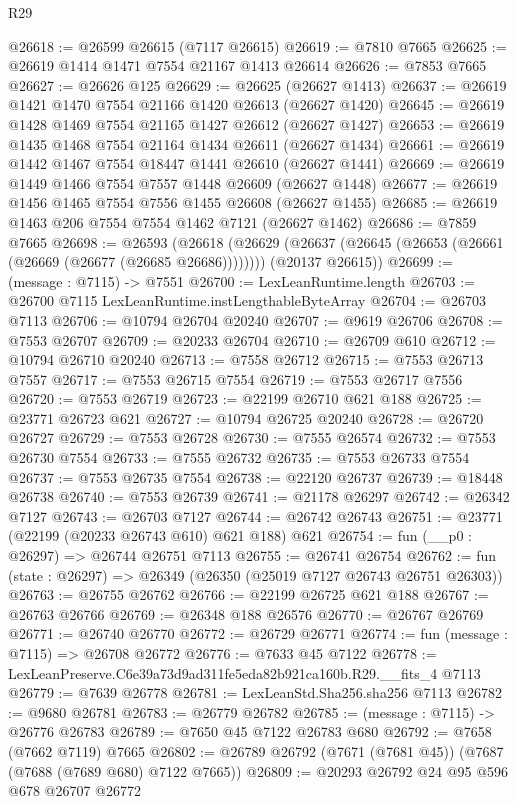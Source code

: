 \begin{lexlean}{R29}
\begin{coremodule}
@26618 := @26599 @26615 (@7117 @26615)
@26619 := @7810 @7665
@26625 := @26619 @1414 @1471 @7554 @21167 @1413 @26614
@26626 := @7853 @7665
@26627 := @26626 @125
@26629 := @26625 (@26627 @1413)
@26637 := @26619 @1421 @1470 @7554 @21166 @1420 @26613 (@26627 @1420)
@26645 := @26619 @1428 @1469 @7554 @21165 @1427 @26612 (@26627 @1427)
@26653 := @26619 @1435 @1468 @7554 @21164 @1434 @26611 (@26627 @1434)
@26661 := @26619 @1442 @1467 @7554 @18447 @1441 @26610 (@26627 @1441)
@26669 := @26619 @1449 @1466 @7554 @7557 @1448 @26609 (@26627 @1448)
@26677 := @26619 @1456 @1465 @7554 @7556 @1455 @26608 (@26627 @1455)
@26685 := @26619 @1463 @206 @7554 @7554 @1462 @7121 (@26627 @1462)
@26686 := @7859 @7665
@26698 := @26593
    (@26618
      (@26629 (@26637 (@26645 (@26653 (@26661 (@26669 (@26677 (@26685 @26686))))))))
      (@20137 @26615))
@26699 := (message : @7115) -> @7551
@26700 := LexLeanRuntime.length
@26703 := @26700 @7115 LexLeanRuntime.instLengthableByteArray
@26704 := @26703 @7113
@26706 := @10794 @26704 @20240
@26707 := @9619 @26706
@26708 := @7553 @26707
@26709 := @20233 @26704
@26710 := @26709 @610
@26712 := @10794 @26710 @20240
@26713 := @7558 @26712
@26715 := @7553 @26713 @7557
@26717 := @7553 @26715 @7554
@26719 := @7553 @26717 @7556
@26720 := @7553 @26719
@26723 := @22199 @26710 @621 @188
@26725 := @23771 @26723 @621
@26727 := @10794 @26725 @20240
@26728 := @26720 @26727
@26729 := @7553 @26728
@26730 := @7555 @26574
@26732 := @7553 @26730 @7554
@26733 := @7555 @26732
@26735 := @7553 @26733 @7554
@26737 := @7553 @26735 @7554
@26738 := @22120 @26737
@26739 := @18448 @26738
@26740 := @7553 @26739
@26741 := @21178 @26297
@26742 := @26342 @7127
@26743 := @26703 @7127
@26744 := @26742 @26743
@26751 := @23771 (@22199 (@20233 @26743 @610) @621 @188) @621
@26754 := fun (__p0 : @26297) => @26744 @26751 @7113
@26755 := @26741 @26754
@26762 := fun (state : @26297) => @26349 (@26350 (@25019 @7127 @26743 @26751 @26303))
@26763 := @26755 @26762
@26766 := @22199 @26725 @621 @188
@26767 := @26763 @26766
@26769 := @26348 @188 @26576
@26770 := @26767 @26769
@26771 := @26740 @26770
@26772 := @26729 @26771
@26774 := fun (message : @7115) => @26708 @26772
@26776 := @7633 @45 @7122
@26778 := LexLeanPreserve.C6e39a73d9ad311fe5eda82b921ca160b.R29.__fits_4 @7113
@26779 := @7639 @26778
@26781 := LexLeanStd.Sha256.sha256 @7113
@26782 := @9680 @26781
@26783 := @26779 @26782
@26785 := (message : @7115) -> @26776 @26783
@26789 := @7650 @45 @7122 @26783 @680
@26792 := @7658 (@7662 @7119) @7665
@26802 := @26789 @26792 (@7671 (@7681 @45)) (@7687 (@7688 (@7689 @680) @7122 @7665))
@26809 := @20293 @26792 @24 @95 @596 @678 @26707 @26772

\end{coremodule}
\end{lexlean}
